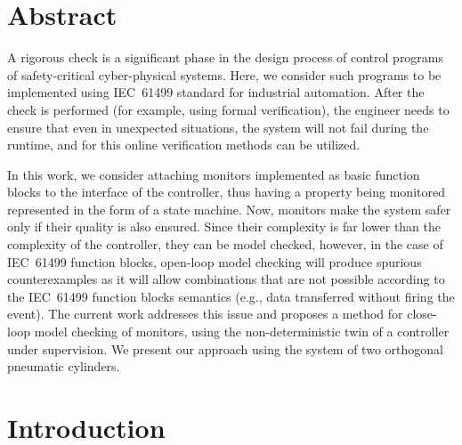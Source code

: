 \begin{bibunit}
\thispagestyle{plain}

\section*{Abstract}
A rigorous check is a significant phase in the design process of control programs of safety-critical cyber-physical systems. Here, we consider such programs to be implemented using IEC~61499 standard for industrial automation. After the check is performed (for example, using formal verification), the engineer needs to ensure that even in unexpected situations, the system will not fail during the runtime, and for this online verification methods can be utilized.

In this work, we consider attaching monitors implemented as basic function blocks to the interface of the controller, thus having a property being monitored represented in the form of a state machine. Now, monitors make the system safer only if their quality is also ensured. Since their complexity is far lower than the complexity of the controller, they can be model checked, however, in the case of IEC~61499 function blocks, open-loop model checking will produce spurious counterexamples as it will allow combinations that are not possible according to the IEC~61499 function blocks semantics (e.g., data transferred without firing the event). The current work addresses this issue and proposes a method for close-loop model checking of monitors, using the non-deterministic twin of a controller under supervision. We present our approach using the system of two orthogonal pneumatic cylinders.

\section{Introduction}





\end{bibunit}
